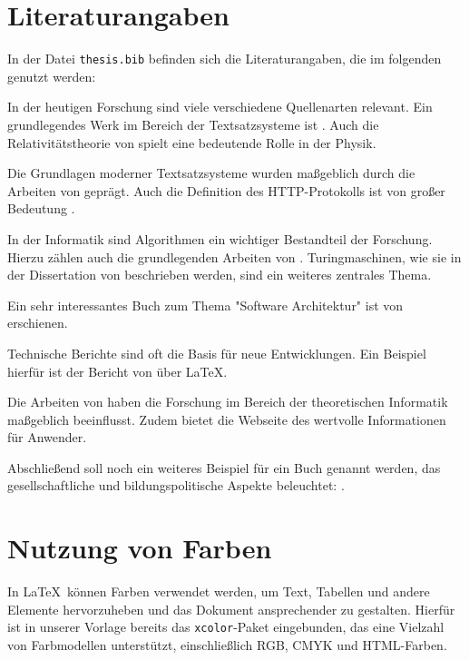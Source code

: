 \section{Literaturangaben}

In der Datei \texttt{thesis.bib} befinden sich die Literaturangaben, die im
folgenden genutzt werden:

In der heutigen Forschung sind viele verschiedene Quellenarten relevant. Ein
grundlegendes Werk im Bereich der Textsatzsysteme ist
\textcite{knuth1984texbook}. Auch die Relativitätstheorie von
\textcite{einstein1905} spielt eine bedeutende Rolle in der Physik.

Die Grundlagen moderner Textsatzsysteme wurden maßgeblich durch die Arbeiten von
\textcite{lamport1986document} geprägt. Auch die Definition des HTTP-Protokolls
ist von großer Bedeutung \cite{rfc2616}.

In der Informatik sind Algorithmen ein wichtiger Bestandteil der Forschung.
Hierzu zählen auch die grundlegenden Arbeiten von \textcite{knuth1997art}.
Turingmaschinen, wie sie in der Dissertation von \textcite{hopcroft1971thesis}
beschrieben werden, sind ein weiteres zentrales Thema.

Ein sehr interessantes Buch zum Thema "Software Architektur" ist von
\textcite{headFirstSoftwareArchitecture} erschienen.

Technische Berichte sind oft die Basis für neue Entwicklungen. Ein Beispiel
hierfür ist der Bericht von \textcite{lamport1994latex} über LaTeX.

Die Arbeiten von \textcite{turing1936thesis} haben die Forschung im Bereich der
theoretischen Informatik maßgeblich beeinflusst. Zudem bietet die Webseite des
\textcite{latexproject} wertvolle Informationen für Anwender.

Abschließend soll noch ein weiteres Beispiel für ein Buch genannt werden, das
gesellschaftliche und bildungspolitische Aspekte beleuchtet:
\textcite{golden2019book}.



\section{Nutzung von Farben}

In \LaTeX\ können Farben verwendet werden, um Text, Tabellen und andere Elemente
hervorzuheben und das Dokument ansprechender zu gestalten. Hierfür ist in
unserer Vorlage bereits das \texttt{xcolor}-Paket eingebunden, das eine Vielzahl
von Farbmodellen unterstützt, einschließlich RGB, CMYK und HTML-Farben.

